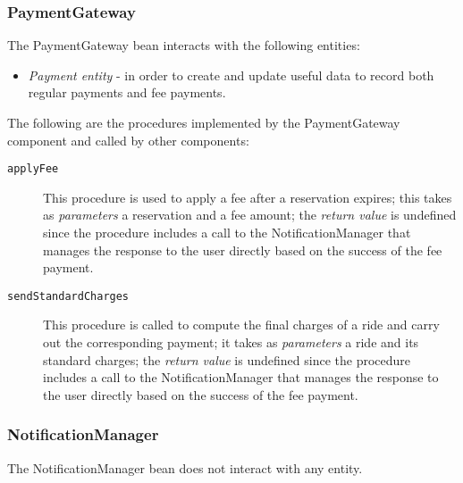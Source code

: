 \subsubsection{PaymentGateway}
The PaymentGateway bean interacts with the following entities:
\begin{itemize}
\item \textit{Payment entity} - in order to create and update useful data to record both regular payments and fee payments.
\end{itemize}

The following are the procedures implemented by the PaymentGateway component and called by other components:
\begin{description}
\item[\texttt{applyFee}] This procedure is used to apply a fee after a reservation expires; this takes as \textit{parameters} a reservation and a fee amount; the \textit{return value} is undefined since the procedure includes a call to the NotificationManager that manages the response to the user directly based on the success of the fee payment.
\item[\texttt{sendStandardCharges}] This procedure is called to compute the final charges of a ride and carry out the corresponding payment; it takes as \textit{parameters} a ride and its standard charges; the \textit{return value} is undefined since the procedure includes a call to the NotificationManager that manages the response to the user directly based on the success of the fee payment.
\end{description}
\subsubsection{NotificationManager}
The NotificationManager bean does not interact with any entity.

